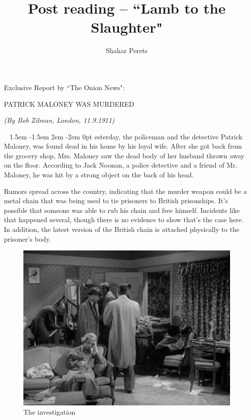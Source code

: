 \documentclass[]{article}
\author{Shahar Perets}
\title{\vspace{-40px}Post reading -- ``Lamb to the Slaughter"}
\def\pstart#1{\noindent\smash{\lower3ex\hbox{\llap{\Huge\frakfamily#1}}}
	\parshape=3 1.5em \dimexpr\hsize-1.5em 2em \dimexpr\hsize-2em 0pt \hsize}
\begin{document}
	
	\maketitle
	
	\vfill
		
	\hfil \large Exclusive Report by ``The Onion News": \hfil
	
	\hfil \Large \MakeUppercase{Patrick Maloney was murdered} \normalsize \hfil 
	
	\vspace{2pt}
	\noindent \textit{(By Bob Zilman, London, 11.9.1911)}
	\vspace{-8pt}
	
	\begin{multicols}{2}
		\noindent\ \pstart{Y}\!esterday, the policeman and the detective Patrick Maloney, was found dead in his home by his loyal wife. After she got back from the grocery shop, Mrs. Maloney saw the dead body of her husband thrown away on the floor. According to Jack Noonan, a police detective and a friend of Mr. Maloney, he was hit by a strong object on the back of his head.
		
		Rumors spread across the country, indicating that the murder weapon could be a metal chain that was being used to tie prisoners to British prisonships. It's possible that someone was able to rub his chain and free himself. Incidents like that happened several, though there is no evidence to show that's the case here. In addition, the latest version of the British chain is attached physically to the prisoner's body. 
		
		\begin{figure}
			\includegraphics[scale=0.23]{capturfiles_264.jpg}
			\caption[]{The investigation}
		\end{figure}
		

\end{multicols}
\end{document}
